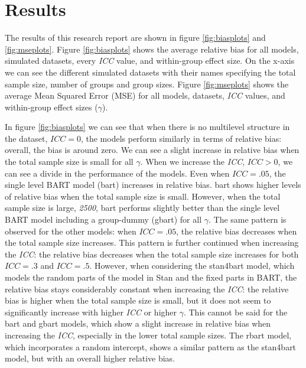 \documentclass[10pt, a4paper, titlepage]{article}
\begin{document}
\section{Results}
\graphicspath{{./graphs/}}

The results of this research report are shown in figure \ref{fig:biasplots} and \ref{fig:mseplots}. Figure \ref{fig:biasplots} shows the average relative bias for all models, simulated datasets, every \textit{ICC} value, and within-group effect size. On the x-axis we can see the different simulated datasets with their names specifying the total sample size, number of groups and group sizes. Figure \ref{fig:mseplots} shows the average Mean Squared Error (MSE) for all models, datasets, \textit{ICC} values, and within-group effect sizes ($\gamma$).

In figure \ref{fig:biasplots} we can see that when there is no multilevel structure in the dataset, $ICC = 0$, the models perform similarly in terms of relative bias: overall, the bias is around zero. We can see a slight increase in relative bias when the total sample size is small for all $\gamma$.
When we increase the \textit{ICC}, $ICC > 0$, we can see a divide in the performance of the models. Even when $ICC = .05$, the single level BART model (bart) increases in relative bias. bart shows higher levels of relative bias when the total sample size is small. However, when the total sample size is large, \textit{2500}, bart performs slightly better than the single level BART model including a group-dummy (gbart) for all $\gamma$. The same pattern is observed for the other models: when $ICC = .05$, the relative bias decreases when the total sample size increases.
This pattern is further continued when increasing the \textit{ICC}: the relative bias decreases when the total sample size increases for both $ICC = .3$ and $ICC = .5$. However, when considering the stan4bart model, which models the random parts of the model in Stan and the fixed parts in BART, the relative bias stays considerably constant when increasing the \textit{ICC}: the relative bias is higher when the total sample size is small, but it does not seem to significantly increase with higher \textit{ICC} or higher $\gamma$.
This cannot be said for the bart and gbart models, which show a slight increase in relative bias when increasing the \textit{ICC}, especially in the lower total sample sizes. The rbart model, which incorporates a random intercept, shows a similar pattern as the stan4bart model, but with an overall higher relative bias.
\end{document}
